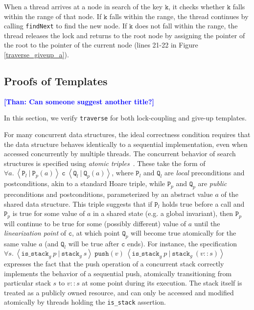 \documentclass[a4paper,UKenglish,cleveref, autoref, thm-restate]{lipics-v2021}
\newcommand{\than}[1]{\textbf{\textcolor{blue}{[Than: #1]}}}
\begin{document}


When a thread arrives at a node in search of the key $\texttt{k}$, it checks whether $\texttt{k}$ falls within the range of that node. If $\texttt{k}$ falls within the range, the thread continues by calling \lstinline{findNext} to find the new node. If $\texttt{k}$ does not fall within the range, the thread releases the lock and returns to the root node by assigning the pointer of the root to the pointer of the current node (lines 21-22 in Figure \ref{traverse_giveup_a}).

\subsection{Proofs of Templates} \than{Can someone suggest another title?}

In this section, we verify \lstinline{traverse} for both lock-coupling and give-up templates.  

For many concurrent data structures, the ideal correctness condition requires that the data structure behaves identically to a sequential implementation, even when accessed concurrently by multiple threads. The concurrent behavior of search structures is specified using \emph{atomic triples}~\cite{tada}. These take the form of $\forall a.\ \left\langle \texttt{P}_l\ |\ \texttt{P}_p(a) \right\rangle\ \texttt{c}\ \left\langle \texttt{Q}_l\ |\ \texttt{Q}_p(a)\right\rangle$, where $\texttt{P}_l$ and $\texttt{Q}_l$ are \emph{local} preconditions and postconditions, akin to a standard Hoare triple, while $\texttt{P}_p$ and $\texttt{Q}_p$ are \emph{public} preconditions and postconditions, parameterized by an abstract value $a$ of the shared data structure. This triple suggests that if $\texttt{P}_l$ holds true before a call and $\texttt{P}_p$ is true for some value of $a$ in a shared state (e.g. a global invariant), then $\texttt{P}_p$ will continue to be true for some (possibly different) value of $a$ until the \emph{linearization point} of $\texttt{c}$, at which point $\texttt{Q}_p$ will become true atomically for the same value $a$ (and $\texttt{Q}_l$ will be true after $\texttt{c}$ ends). For instance, the specification
$\forall s.\ \left\langle \texttt{is\_stack}_g\ p\ |\ \texttt{stack}_g\ s\right\rangle\ \texttt{push}(v)\ \left\langle \texttt{is\_stack}_g\ p\ |\ \texttt{stack}_g\ (v::s)\right\rangle$
expresses the fact that the push operation of a concurrent stack correctly implements the behavior of a sequential push, atomically transitioning from particular stack $s$ to $v::s$ at some point during its execution. The stack itself is treated as a publicly owned resource, and can only be accessed and modified atomically by threads holding the \texttt{is\_stack} assertion.
\end{document}
